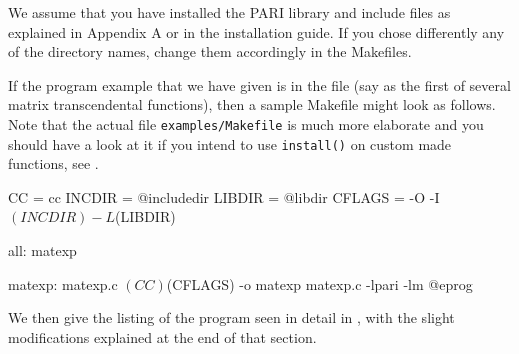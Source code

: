 
We assume that you have installed the PARI library and include files as
explained in Appendix A or in the installation guide. If you chose
differently any of the directory names, change them accordingly in the
Makefiles.

If the program example that we have given is in the file  (say
as the first of several matrix transcendental functions), then a sample
Makefile might look as follows. Note that the actual file
{\tt examples/Makefile} is much more elaborate and you should have a look at
it if you intend to use {\tt install()} on custom made functions, see
.

\bprog
CC = cc
INCDIR = @includedir
LIBDIR = @libdir
CFLAGS = -O -I$(INCDIR) -L$(LIBDIR)

all:  matexp

matexp:  matexp.c
      $(CC) $(CFLAGS) -o matexp matexp.c -lpari -lm
@eprog

\noindent We then give the listing of the program 
seen in detail in , with the slight modifications explained
at the end of that section.

\vfill\eject

